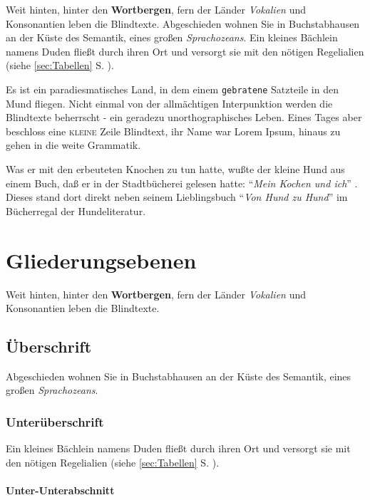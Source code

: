 \documentclass[%
	12pt,%
	a4paper,%
	oneside,%
	liststotoc, idxtotoc, bibtotoc, %
	parskip=half,%
	nochapterprefix,%
	appendixprefix, %
	headings=small,%
]{scrreprt}
\begin{document}
Weit hinten, hinter den \textbf{Wortbergen}, fern der Länder \textit{Vokalien} und Konsonantien leben die Blindtexte. Abgeschieden wohnen Sie in Buchstabhausen an der Küste%
des Semantik, eines großen \textsl{Sprachozeans}. Ein kleines Bächlein namens Duden fließt durch ihren Ort und versorgt sie mit den nötigen Regelialien (siehe \ref{sec:Tabellen} S. \pageref{sec:Tabellen}).

Es ist ein paradiesmatisches Land, in dem einem \texttt{gebratene} Satzteile in den Mund fliegen. Nicht einmal von der allmächtigen Interpunktion%
 werden die Blindtexte beherrscht - ein geradezu unorthographisches Leben. Eines Tages aber beschloss eine \textsc{kleine} Zeile Blindtext, ihr Name war Lorem Ipsum, hinaus zu gehen in die weite Grammatik. 

Was er mit den erbeuteten Knochen zu tun hatte, wußte der kleine Hund aus einem Buch, daß er in der Stadtbücherei
gelesen hatte: "`\emph{Mein Kochen und ich}"' \cite{ansorge:1999}. Dieses stand dort direkt neben seinem Lieblingsbuch
"`\emph{Von Hund zu Hund}"' \cite{balzert:SWT1} im Bücherregal der Hundeliteratur.

\chapter{Gliederungsebenen}
\label{sec:Gliederung}

Weit hinten, hinter den \textbf{Wortbergen}, fern der Länder \textit{Vokalien} und Konsonantien leben die Blindtexte.

\section{Überschrift}

Abgeschieden wohnen Sie in Buchstabhausen an der Küste des Semantik, eines großen \textsl{Sprachozeans}. 

\subsection{Unterüberschrift}

Ein kleines Bächlein namens Duden fließt durch ihren Ort und versorgt sie mit den nötigen Regelialien (siehe \ref{sec:Tabellen} S. \pageref{sec:Tabellen}).

\subsubsection{Unter-Unterabschnitt}
\end{document}
